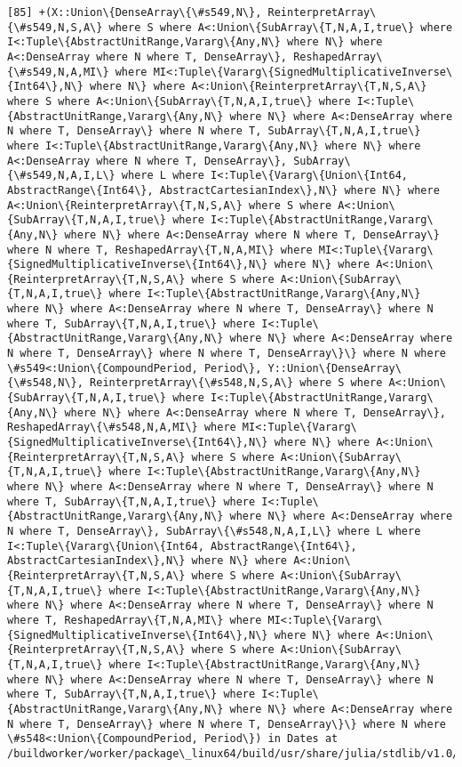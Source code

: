 \documentclass[11pt]{article}
\begin{document}
\begin{Verbatim}[commandchars=\\\{\}]
        [85] +(X::Union\{DenseArray\{\#s549,N\}, ReinterpretArray\{\#s549,N,S,A\} where S where A<:Union\{SubArray\{T,N,A,I,true\} where I<:Tuple\{AbstractUnitRange,Vararg\{Any,N\} where N\} where A<:DenseArray where N where T, DenseArray\}, ReshapedArray\{\#s549,N,A,MI\} where MI<:Tuple\{Vararg\{SignedMultiplicativeInverse\{Int64\},N\} where N\} where A<:Union\{ReinterpretArray\{T,N,S,A\} where S where A<:Union\{SubArray\{T,N,A,I,true\} where I<:Tuple\{AbstractUnitRange,Vararg\{Any,N\} where N\} where A<:DenseArray where N where T, DenseArray\} where N where T, SubArray\{T,N,A,I,true\} where I<:Tuple\{AbstractUnitRange,Vararg\{Any,N\} where N\} where A<:DenseArray where N where T, DenseArray\}, SubArray\{\#s549,N,A,I,L\} where L where I<:Tuple\{Vararg\{Union\{Int64, AbstractRange\{Int64\}, AbstractCartesianIndex\},N\} where N\} where A<:Union\{ReinterpretArray\{T,N,S,A\} where S where A<:Union\{SubArray\{T,N,A,I,true\} where I<:Tuple\{AbstractUnitRange,Vararg\{Any,N\} where N\} where A<:DenseArray where N where T, DenseArray\} where N where T, ReshapedArray\{T,N,A,MI\} where MI<:Tuple\{Vararg\{SignedMultiplicativeInverse\{Int64\},N\} where N\} where A<:Union\{ReinterpretArray\{T,N,S,A\} where S where A<:Union\{SubArray\{T,N,A,I,true\} where I<:Tuple\{AbstractUnitRange,Vararg\{Any,N\} where N\} where A<:DenseArray where N where T, DenseArray\} where N where T, SubArray\{T,N,A,I,true\} where I<:Tuple\{AbstractUnitRange,Vararg\{Any,N\} where N\} where A<:DenseArray where N where T, DenseArray\} where N where T, DenseArray\}\} where N where \#s549<:Union\{CompoundPeriod, Period\}, Y::Union\{DenseArray\{\#s548,N\}, ReinterpretArray\{\#s548,N,S,A\} where S where A<:Union\{SubArray\{T,N,A,I,true\} where I<:Tuple\{AbstractUnitRange,Vararg\{Any,N\} where N\} where A<:DenseArray where N where T, DenseArray\}, ReshapedArray\{\#s548,N,A,MI\} where MI<:Tuple\{Vararg\{SignedMultiplicativeInverse\{Int64\},N\} where N\} where A<:Union\{ReinterpretArray\{T,N,S,A\} where S where A<:Union\{SubArray\{T,N,A,I,true\} where I<:Tuple\{AbstractUnitRange,Vararg\{Any,N\} where N\} where A<:DenseArray where N where T, DenseArray\} where N where T, SubArray\{T,N,A,I,true\} where I<:Tuple\{AbstractUnitRange,Vararg\{Any,N\} where N\} where A<:DenseArray where N where T, DenseArray\}, SubArray\{\#s548,N,A,I,L\} where L where I<:Tuple\{Vararg\{Union\{Int64, AbstractRange\{Int64\}, AbstractCartesianIndex\},N\} where N\} where A<:Union\{ReinterpretArray\{T,N,S,A\} where S where A<:Union\{SubArray\{T,N,A,I,true\} where I<:Tuple\{AbstractUnitRange,Vararg\{Any,N\} where N\} where A<:DenseArray where N where T, DenseArray\} where N where T, ReshapedArray\{T,N,A,MI\} where MI<:Tuple\{Vararg\{SignedMultiplicativeInverse\{Int64\},N\} where N\} where A<:Union\{ReinterpretArray\{T,N,S,A\} where S where A<:Union\{SubArray\{T,N,A,I,true\} where I<:Tuple\{AbstractUnitRange,Vararg\{Any,N\} where N\} where A<:DenseArray where N where T, DenseArray\} where N where T, SubArray\{T,N,A,I,true\} where I<:Tuple\{AbstractUnitRange,Vararg\{Any,N\} where N\} where A<:DenseArray where N where T, DenseArray\} where N where T, DenseArray\}\} where N where \#s548<:Union\{CompoundPeriod, Period\}) in Dates at /buildworker/worker/package\_linux64/build/usr/share/julia/stdlib/v1.0/Dates/src/periods.jl:362

\end{Verbatim}
\end{document}
